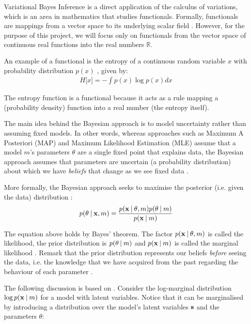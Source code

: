 \documentclass[../main.tex]{subfiles}
\begin{document}
\par Variational Bayes Inference is a direct application of the calculus of variations, which is an area in mathematics that studies functionals. Formally, functionals are mappings from a vector space to its underlying scalar field \cite{Bishop2006}. However, for the purpose of this project, we will focus only on functionals from the vector space of continuous real functions into the real numbers $\mathbb{R}$. 
\par An example of a functional is the entropy of a continuous random variable $x$ with probability distribution $p(x)$ \cite{Bishop2006}, given by:
\begin{align*}
H \big[ x \big] = - \int p(x) \log{p(x)} dx
\end{align*}
\par The entropy function is a functional because it acts as a rule mapping a (probability density) function into a real number (the entropy itself).
\par The main idea behind the Bayesian approach is to model uncertainty rather than assuming fixed models. In other words, whereas approaches such as Maximum A Posteriori (MAP) and Maximum Likelihood Estimation (MLE) assume that a model $m$'s parameters $\theta$ are a single fixed point that explains data, the Bayesian approach assumes that parameters are uncertain (a probability distribution) about which we have \emph{beliefs} that change as we see fixed data \cite{Genovese2004}. 
\par More formally, the Bayesian approach seeks to maximise the posterior (i.e. given the data) distribution \cite{Beal2003}:
\begin{equation}\label{eq:bayes_posterior}
p(\theta \:\vert\: \mathbf{x}, m) = \frac{p(\mathbf{x} \:\vert\: \theta, m)p(\theta \:\vert\: m)}{p(\mathbf{x} \:\vert\: m)}
\end{equation}
\par The equation above holds by Bayes' theorem. The factor $p(\mathbf{x} \:\vert\: \theta, m)$ is called the likelihood, the prior distribution is $p(\theta \:\vert\: m)$ and $p(\mathbf{x} \:\vert\: m)$ is called the marginal likelihood \cite{Beal2003}. Remark that the prior distribution represents our beliefs \emph{before} seeing the data, i.e. the knowledge that we have acquired from the past regarding the behaviour of each parameter \cite{Murphy2012}.
\par The following discussion is based on \cite{Ghahramani2001,Beal2003}. Consider the log-marginal distribution $\log{p(\mathbf{x} \:\vert\: m)}$ for a model with latent variables. Notice that it can be marginalised by introducing a distribution over the model's latent variables $\mathbf{s}$ and the parameters $\theta$:
\end{document}
